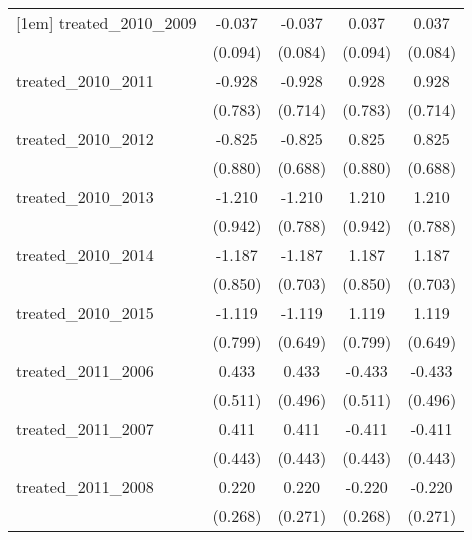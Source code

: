 {\begin{tabular}{l*{4}{c}}
[1em]
treated\_2010\_2009&      -0.037         &      -0.037         &       0.037         &       0.037         \\
            &     (0.094)         &     (0.084)         &     (0.094)         &     (0.084)         \\
[1em]
treated\_2010\_2011&      -0.928         &      -0.928         &       0.928         &       0.928         \\
            &     (0.783)         &     (0.714)         &     (0.783)         &     (0.714)         \\
[1em]
treated\_2010\_2012&      -0.825         &      -0.825         &       0.825         &       0.825         \\
            &     (0.880)         &     (0.688)         &     (0.880)         &     (0.688)         \\
[1em]
treated\_2010\_2013&      -1.210         &      -1.210         &       1.210         &       1.210         \\
            &     (0.942)         &     (0.788)         &     (0.942)         &     (0.788)         \\
[1em]
treated\_2010\_2014&      -1.187         &      -1.187         &       1.187         &       1.187         \\
            &     (0.850)         &     (0.703)         &     (0.850)         &     (0.703)         \\
[1em]
treated\_2010\_2015&      -1.119         &      -1.119         &       1.119         &       1.119         \\
            &     (0.799)         &     (0.649)         &     (0.799)         &     (0.649)         \\
[1em]
treated\_2011\_2006&       0.433         &       0.433         &      -0.433         &      -0.433         \\
            &     (0.511)         &     (0.496)         &     (0.511)         &     (0.496)         \\
[1em]
treated\_2011\_2007&       0.411         &       0.411         &      -0.411         &      -0.411         \\
            &     (0.443)         &     (0.443)         &     (0.443)         &     (0.443)         \\
[1em]
treated\_2011\_2008&       0.220         &       0.220         &      -0.220         &      -0.220         \\
            &     (0.268)         &     (0.271)         &     (0.268)         &     (0.271)         \\

\end{tabular}}
